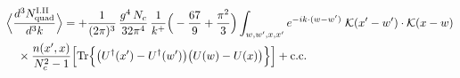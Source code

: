 \begingroup\small
\begin{align}\label{eq:S-I.II-2o}
&\Big\langle\frac{d^{3}N^{\rm I.II}_{{\rm quad}}}{d^{3}k}\Big\rangle=+\frac{1}{(2\pi)^{3}}\, \frac{g^{4}\,N_{c}}{32\pi^{4}}\, \frac{1}{k^{+}}\Big(-\frac{67}{9}+\frac{\pi^{2}}{3}\Big) \int_{w,w',x,x'} e^{-ik\cdot(w-w')}\;\mathcal{K}(x'-w')\cdot\mathcal{K}(x-w)\notag\\
&\quad \times\frac{n(x',x)}{N_{c}^{2}-1}\Big[ {\rm Tr}\Big\{\big(U^{\dagger}(x')-U^{\dagger}(w')\big)\big(U(w)-U(x)\big)\Big\}\Big] +{\rm c.c.}
\end{align}
\endgroup
